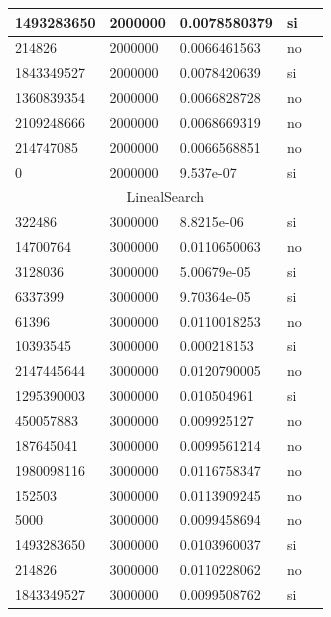 \documentclass[12pt, fleqn]{article}                             %
\theoremstyle{break}                                            %
\begin{document}
\begin{longtable}{|m{5em}|m{5em}|m{10em}|m{5em}|@{}m{0pt}@{}}
            1493283650& 2000000  & 0.0078580379 & si &\\[1em]    \hline
            214826& 2000000  & 0.0066461563 & no &\\[1em]    \hline
            1843349527& 2000000  & 0.0078420639 & si &\\[1em]    \hline
            1360839354& 2000000  & 0.0066828728 & no &\\[1em]    \hline
            2109248666& 2000000  & 0.0068669319 & no &\\[1em]    \hline
            214747085& 2000000  & 0.0066568851 & no &\\[1em]    \hline
            0& 2000000  & 9.537e-07 & si &\\[1em]    \hline
            \multicolumn{5}{|c|}{LinealSearch}   \\          \hline
            322486& 3000000  & 8.8215e-06 & si &\\[1em]    \hline
            14700764& 3000000  & 0.0110650063 & no &\\[1em]    \hline
            3128036& 3000000  & 5.00679e-05 & si &\\[1em]    \hline
            6337399& 3000000  & 9.70364e-05 & si &\\[1em]    \hline
            61396& 3000000  & 0.0110018253 & no &\\[1em]    \hline
            10393545& 3000000  & 0.000218153 & si &\\[1em]    \hline
            2147445644& 3000000  & 0.0120790005 & no &\\[1em]    \hline
            1295390003& 3000000  & 0.010504961 & si &\\[1em]    \hline
            450057883& 3000000  & 0.009925127 & no &\\[1em]    \hline
            187645041& 3000000  & 0.0099561214 & no &\\[1em]    \hline
            1980098116& 3000000  & 0.0116758347 & no &\\[1em]    \hline
            152503& 3000000  & 0.0113909245 & no &\\[1em]    \hline
            5000& 3000000  & 0.0099458694 & no &\\[1em]    \hline
            1493283650& 3000000  & 0.0103960037 & si &\\[1em]    \hline
            214826& 3000000  & 0.0110228062 & no &\\[1em]    \hline
            1843349527& 3000000  & 0.0099508762 & si &\\[1em]    \hline

\end{longtable}
\end{document}

